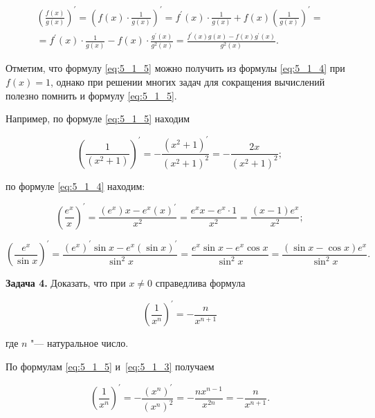 \begin{multline*}
\displaystyle
\left( \frac{f(x)}{g(x)} \right)^\prime =
\left( f(x) \cdot \frac{1}{g(x)} \right)^\prime =
f^\prime(x) \cdot \frac{1}{g(x)} + f(x) \left( \frac{1}{g(x)} \right)^\prime = \\
= f^\prime(x) \cdot \frac{1}{g(x)} - f(x) \cdot \frac{g^\prime(x)}{g^{2}(x)} =
\frac{f^\prime(x)g(x) - f(x)g^\prime(x)}{g^{2}(x)}.
\end{multline*}

Отметим, что формулу \eqref{eq:5_1_5} можно получить из формулы \eqref{eq:5_1_4}
при $f(x) = 1$, однако при решении многих задач для сокращения вычислений
полезно помнить и формулу \eqref{eq:5_1_5}.

Например, по формуле \eqref{eq:5_1_5} находим

\begin{equation*}
\displaystyle
\left( \frac{1}{\left( x^{2} + 1 \right)} \right)^\prime = 
-\frac{\left( x^{2} + 1 \right)^\prime}{\left( x^{2} + 1 \right)^{2}} =
-\frac{2x}{\left( x^{2} + 1 \right)^{2}};
\end{equation*}

\noindent
по формуле \eqref{eq:5_1_4} находим:

\begin{equation*}
\displaystyle
\left( \frac{e^{x}}{x} \right)^\prime = 
\frac{\left(e^{x}\right)x - e^{x}(x)^\prime}{x^{2}} =
\frac{e^{x}x - e^{x} \cdot 1}{x^{2}} =
\frac{(x-1)e^{x}}{x^{2}};
\end{equation*}

\begin{equation*}
\displaystyle
\left( \frac{e^{x}}{\sin x} \right)^\prime =
\frac{\left( e^{x} \right)^\prime \sin x - e^{x}(\sin x)^\prime}{\sin^{2} x} =
\frac{e^{x} \sin x - e^{x} \cos x}{\sin^{2} x} =
\frac{\left( \sin x - \cos x \right) e^{x}}{\sin^{2} x}.
\end{equation*}

\textbf{Задача 4.}\label{ex:5_1_4} Доказать, что при $x \ne 0$ справедлива формула

\begin{equation}\label{eq:5_1_6}
\displaystyle
\left( \frac{1}{x^{n}} \right)^\prime = -\frac{n}{x^{n+1}}
\end{equation}

\noindent
где $n$ "--- натуральное число.

По формулам \eqref{eq:5_1_5} и~\eqref{eq:5_1_3} получаем

\begin{equation*}
\displaystyle
\left( \frac{1}{x^{n}} \right)^\prime =
-\frac{\left( x^{n} \right)^\prime}{\left( x^{n} \right)^{2}} =
-\frac{nx^{n-1}}{x^{2n}} = -\frac{n}{x^{n+1}}.
\end{equation*}

